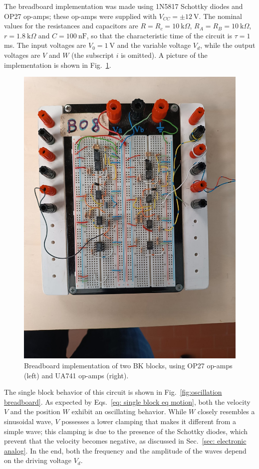 The breadboard implementation was made using 1N5817 Schottky diodes
and OP27 op-amps; these op-amps were
supplied with $V_{CC}=\pm12~\text{V}$. The nominal values for the
resistances and capacitors are $R=R_c=10~\text{k}\Omega$,
$R_A=R_B=10~\text{k}\Omega$, $r=1.8~\text{k}\Omega$ and
$C=100~\text{nF}$, so that the characteristic time of the circuit is $\tau=1$ ms.
The input voltages are $V_0=1~\text{V}$ and
the variable voltage $V_d$, while the output voltages are
$V$ and $W$ (the subscript $i$ is omitted).
A picture of the implementation is shown in Fig.~\ref{fig: photo breadboard}.

\begin{figure}[!htbp]
\centering
    \includegraphics[width=.5\linewidth]{images/photo_breadboard.jpeg}
    \caption{Breadboard implementation of two BK blocks, using OP27 op-amps (left) and UA741 op-amps
    (right).
    }\label{fig: photo breadboard}
\end{figure}

The single block behavior of this circuit is shown in Fig.~\ref{fig:oscillation breadboard}.
As expected by Eqs.~\ref{eq: single block eq motion}, both the velocity $V$ and the position $W$
exhibit an oscillating behavior. While $W$ closely resembles a sinusoidal wave, $V$ possesses
a lower clamping that makes it different from a simple wave; this clamping is due
to the presence of the Schottky diodes, which prevent that the velocity becomes negative, as
discussed in Sec.~\ref{sec: electronic analog}.
In the end, both the frequency and the amplitude of the waves depend on the driving voltage $V_d$.


